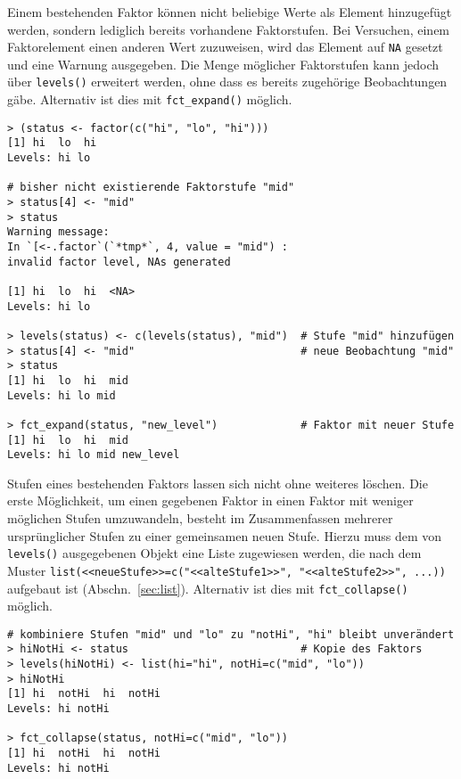 Einem bestehenden Faktor können nicht beliebige Werte als Element hinzugefügt werden, sondern lediglich bereits vorhandene Faktorstufen. Bei Versuchen, einem Faktorelement einen anderen Wert zuzuweisen, wird das Element auf \lstinline!NA! gesetzt und eine Warnung ausgegeben. Die Menge möglicher Faktorstufen kann jedoch über \lstinline!levels()! erweitert werden, ohne dass es bereits zugehörige Beobachtungen gäbe. Alternativ ist dies mit \lstinline!fct_expand()! möglich.
\begin{lstlisting}
> (status <- factor(c("hi", "lo", "hi")))
[1] hi  lo  hi
Levels: hi lo

# bisher nicht existierende Faktorstufe "mid"
> status[4] <- "mid"
> status
Warning message:
In `[<-.factor`(`*tmp*`, 4, value = "mid") :
invalid factor level, NAs generated

[1] hi  lo  hi  <NA>
Levels: hi lo

> levels(status) <- c(levels(status), "mid")  # Stufe "mid" hinzufügen
> status[4] <- "mid"                          # neue Beobachtung "mid"
> status
[1] hi  lo  hi  mid
Levels: hi lo mid

> fct_expand(status, "new_level")             # Faktor mit neuer Stufe
[1] hi  lo  hi  mid
Levels: hi lo mid new_level
\end{lstlisting}

Stufen eines bestehenden Faktors lassen sich nicht ohne weiteres löschen. Die erste Möglichkeit, um einen gegebenen Faktor in einen Faktor mit weniger möglichen Stufen umzuwandeln, besteht im Zusammenfassen mehrerer ursprünglicher Stufen zu einer gemeinsamen neuen Stufe. Hierzu muss dem von \lstinline!levels()! ausgegebenen Objekt eine Liste zugewiesen werden, die nach dem Muster \lstinline!list(<<neueStufe>>=c("<<alteStufe1>>", "<<alteStufe2>>", ...))! aufgebaut ist (Abschn.\ \ref{sec:list}). Alternativ ist dies mit \lstinline!fct_collapse()! möglich.
\begin{lstlisting}
# kombiniere Stufen "mid" und "lo" zu "notHi", "hi" bleibt unverändert
> hiNotHi <- status                           # Kopie des Faktors
> levels(hiNotHi) <- list(hi="hi", notHi=c("mid", "lo"))
> hiNotHi
[1] hi  notHi  hi  notHi
Levels: hi notHi

> fct_collapse(status, notHi=c("mid", "lo"))
[1] hi  notHi  hi  notHi
Levels: hi notHi
\end{lstlisting}

